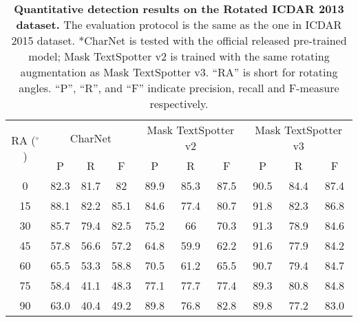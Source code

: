 \documentclass[runningheads]{llncs}
\begin{document}
\begin{table*}[ht]
    \setlength{\tabcolsep}{8.0pt}
    \label{tab:rotated_ic13_det}
    \centering
    \caption{\textbf{Quantitative detection results on the Rotated ICDAR 2013 dataset.} The evaluation protocol is the same as the one in ICDAR 2015 dataset. *CharNet is tested with the official released pre-trained model; Mask TextSpotter v2 is trained with the same rotating augmentation as Mask TextSpotter v3. ``RA'' is short for rotating angles. ``P'', ``R'', and ``F'' indicate precision, recall and F-measure respectively.}
    \begin{tabularx}{1.0\textwidth}{c*{9}c}
    \toprule
    \multirow{2}{*}{RA ($^\circ$)} & \multicolumn{3}{c}{CharNet} & \multicolumn{3}{c}{Mask TextSpotter v2} & \multicolumn{3}{c}{Mask TextSpotter v3} \\ \cline{2-10} 
                                     & P       & R       & F       & P           & R           & F           & P          & R          & F         \\
    \midrule
    0                               & 82.3    & 81.7    & 82      & 89.9        & 85.3        & 87.5        & 90.5       & 84.4       & 87.4      \\
    15                              & 88.1    & 82.2    & 85.1    & 84.6        & 77.4        & 80.7        & 91.8       & 82.3       & 86.8      \\
    30                              & 85.7    & 79.4    & 82.5    & 75.2        & 66          & 70.3        & 91.3       & 78.9       & 84.6      \\
    45                              & 57.8    & 56.6    & 57.2    & 64.8        & 59.9        & 62.2        & 91.6       & 77.9       & 84.2      \\
    60                              & 65.5    & 53.3    & 58.8    & 70.5        & 61.2        & 65.5        & 90.7       & 79.4       & 84.7      \\
    75                              & 58.4    & 41.1    & 48.3    & 77.1        & 77.7        & 77.4        & 89.3       & 80.8       & 84.8      \\
    90                              & 63.0      & 40.4    & 49.2    & 89.8        & 76.8        & 82.8        & 89.8       & 77.2       & 83.0  \\
    \bottomrule  
    \end{tabularx}
\end{table*}
\end{document}
